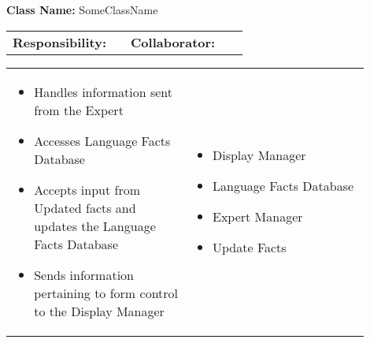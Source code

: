 \begin{cards}[]
    \textbf{Class Name:} SomeClassName
    \tcbline
    \begin{tabular}{p{0.45\linewidth} | p{0.45\linewidth}}
        \textbf{Responsibility:}& 
        \textbf{Collaborator:}\\
    \end{tabular}
    \tcbline
    \begin{tabular}{p{0.45\linewidth} | p{0.45\linewidth}}
        \begin{itemize}
            \item Handles information sent from the Expert
            \item Accesses Language Facts Database
            \item Accepts input from Updated facts and updates the Language Facts Database
            \item Sends information pertaining to form control to the Display Manager
             
        \end{itemize}
        &
        \begin{itemize}
            \item Display Manager
            \item Language Facts Database
            \item Expert Manager
            \item Update Facts
            
        \end{itemize}
    \end{tabular}
\end{cards}
